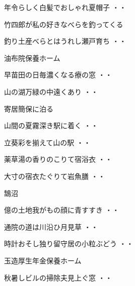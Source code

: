 \vspace{0.4cm}
\begin{shiika}年令らしく白髪でおしゃれ夏帽子
\hfill{・・}\end{shiika}
\vspace{0.4cm}
竹四郎が私の好きなべらを釣ってくる
\begin{shiika}釣り土産べらとはうれし瀬戸育ち
\hfill{・・}\end{shiika}
\vspace{0.4cm}
油布院保養ホーム
\begin{shiika}早苗田の日毎濃くなる療の窓
\hfill{・・}\end{shiika}
\begin{shiika}山の湖万緑の中遠くあり
\hfill{・・}\end{shiika}
\vspace{0.4cm}
寄居簡保に泊る
\begin{shiika}山間の夏霧深き駅に着く
\hfill{・・}\end{shiika}
\begin{shiika}立葵彩を揃えて山の駅
\hfill{・・}\end{shiika}
\begin{shiika}薬草湯の香りのこりて宿浴衣
\hfill{・・}\end{shiika}
\begin{shiika}大寸の宿衣たぐりて岩魚膳
\hfill{・・}\end{shiika}
\vspace{0.4cm}
鵠沼
\begin{shiika}億の土地我がもの顔に青すすき
\hfill{・・}\end{shiika}
\begin{shiika}通院の道は川沿ひ月見草
\hfill{・・}\end{shiika}
\begin{shiika}時計おそし独り留守居の小粒ぶどう
\hfill{・・}\end{shiika}
\vspace{0.4cm}
玉造厚生年金保養ホーム
\begin{shiika}秋暑しビルの掃除夫見上ぐ窓
\hfill{・・}\end{shiika}
